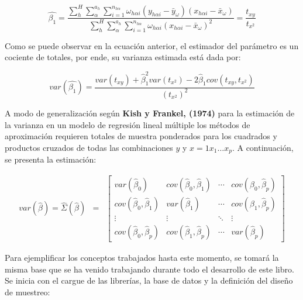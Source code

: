 \documentclass[
  12pt,
]{book}
\begin{document}
\[
\hat{\beta_{1}}  =  \frac{{\sum_{h}^{H}\sum_{\alpha}^{a_{h}}\sum_{i=1}^{n_{h\alpha}}\omega_{h\alpha i}\left(y_{h\alpha i}-\bar{y}_{\omega}\right)\left(x_{h\alpha i}-\bar{x}_{\omega}\right)}}{{ \sum_{h}^{H}\sum_{\alpha}^{a_{h}}\sum_{i=1}^{n_{h\alpha}}\omega_{h\alpha i}\left(x_{h\alpha i}-\bar{x}_{\omega}\right)^{2}}}
  = \frac{t_{xy}}{t_{x^{2}}}
\]

Como se puede observar en la ecuación anterior, el estimador del parámetro es un cociente de totales, por ende, su varianza estimada está dada por:

\[
var\left(\hat{\beta_{1}}\right)  =  \frac{var\left(t_{xy}\right)+\hat{\beta}_{1}^{2}var\left(t_{x^{2}}\right)-2\hat{\beta}_{1}cov\left(t_{xy},t_{x^{2}}\right)}{\left(t_{x^{2}}\right)^{2}}
\]

A modo de generalización según \textbf{Kish y Frankel, (1974)} para la estimación de la varianza en un modelo de regresión lineal múltiple los métodos de aproximación requieren totales de muestra ponderados para los cuadrados y productos cruzados de todas las combinaciones \(y\) y \(x = {1 x_{1} … x_{p}}\). A continuación, se presenta la estimación:

\begin{eqnarray*}
var\left(\hat{\beta}\right)=\hat{\Sigma}\left(\hat{\beta}\right) & = & \left[\begin{array}{cccc}
var\left(\hat{\beta}_{0}\right) & cov\left(\hat{\beta}_{0},\hat{\beta}_{1}\right) & \cdots & cov\left(\hat{\beta}_{0},\hat{\beta}_{p}\right)\\
cov\left(\hat{\beta}_{0},\hat{\beta}_{1}\right) & var\left(\hat{\beta}_{1}\right) & \cdots & cov\left(\hat{\beta}_{1},\hat{\beta}_{p}\right)\\
\vdots & \vdots & \ddots & \vdots\\
cov\left(\hat{\beta}_{0},\hat{\beta}_{p}\right) & cov\left(\hat{\beta}_{1},\hat{\beta}_{p}\right) & \cdots & var\left(\hat{\beta}_{p}\right)
\end{array}\right]
\end{eqnarray*}

Para ejemplificar los conceptos trabajados hasta este momento, se tomará la misma base que se ha venido trabajando durante todo el desarrollo de este libro. Se inicia con el cargue de las librerías, la base de datos y la definición del diseño de muestreo:
\end{document}
